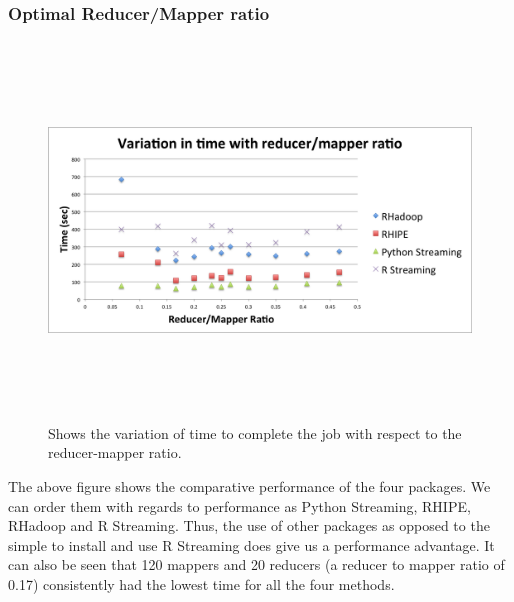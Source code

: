\documentclass[
journal=jacsat, %
manuscript=article]{achemso}
\begin{document}
\subsubsection{Optimal Reducer/Mapper ratio}
\begin{figure}

\includegraphics[width=16cm,height=10cm,keepaspectratio]{rm_ratio.png}

  \caption{Shows the variation of time to complete the job with respect to the reducer-mapper ratio.}

  \label{rm_ratio}

\end{figure}
The above figure shows the comparative performance of the four packages. We can order them with regards to performance as Python Streaming, RHIPE, RHadoop and R Streaming. Thus, the use of other packages as opposed to the simple to install and use R Streaming does give us a performance advantage. It can also be seen that 120 mappers and 20 reducers (a reducer to mapper ratio of 0.17) consistently had the lowest time for all the four methods. 
\end{document}
